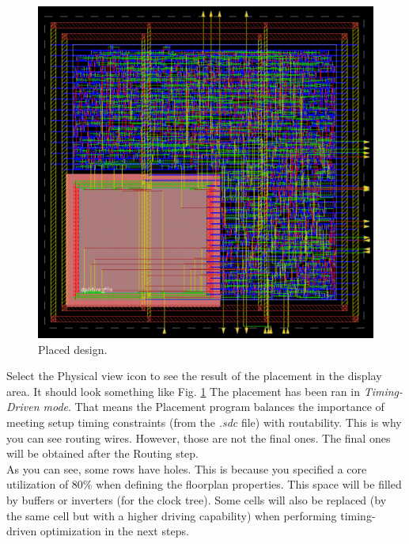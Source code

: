 	\parbox[t]{\dimexpr\textwidth-\leftmargin}{%
		\begin{figure}
			\vspace{0mm}
			\centering
			\vspace{-\baselineskip}
			\includegraphics[scale=0.27]{figures/lab5_backend/design_placed}
			\caption{Placed design.}
			\label{fig_place_design}
		\end{figure}
Select the Physical view icon  to see the result of the placement in the display area. It should look something like Fig. \ref{fig_place_design} The placement has been ran in \textit{Timing-Driven mode}. That means the Placement program balances the importance of meeting setup timing constraints (from the \textit{.sdc} file) with routability. This is why you can see routing wires. However, those are not the final ones. The final ones will be obtained after the Routing step. \\
As you can see, some rows have holes. This is because you specified a core utilization of 80$\%$ when defining the floorplan properties. This space will be filled by buffers or inverters (for the clock tree). Some cells will also be replaced (by the same cell but with a higher driving capability) when performing timing-driven optimization in the next steps. \\
	} 

